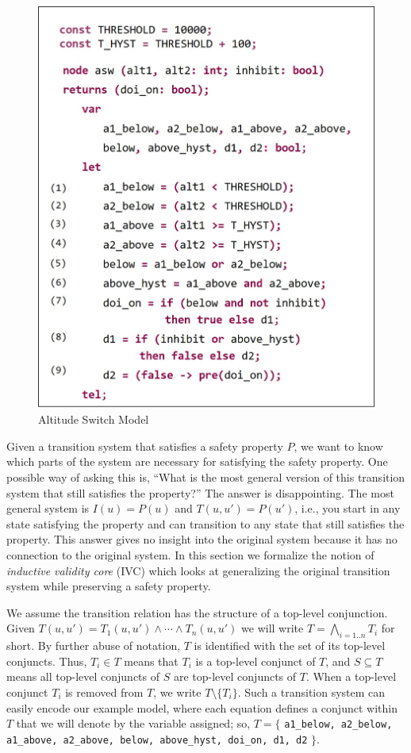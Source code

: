 \begin{figure}
\centering
\includegraphics[width=0.7\columnwidth]{figs/code.jpg}
\vspace{-0.1in}
\caption{Altitude Switch Model }
\label{fig:asw}
\end{figure}



Given a transition system that satisfies a safety property $P$, we
want to know which parts of the system are necessary for satisfying
the safety property. One possible way of asking this is, ``What is the
most general version of this transition system that still satisfies
the property?'' The answer is disappointing. The most general system is
$I(u) = P(u)$ and $T(u, u') = P(u')$, i.e., you start in any state
satisfying the property and can transition to any state that still
satisfies the property. This answer gives no insight into the original
system because it has no connection to the original system. In this
section we formalize the notion of {\em inductive validity core} (IVC)
which looks at generalizing the original transition system while
preserving a safety property.

We assume the transition relation has the structure of a top-level conjunction.  Given $T(u, u') = T_1(u, u') \land \cdots \land T_n(u, u')$ we will write $T = \bigwedge_{i=1..n}T_i$ for short.
By further abuse of notation,
$T$ is identified with the set of its top-level conjuncts. Thus, $T_i \in
T$ means that $T_i$ is a top-level conjunct of $T$, and $S
\subseteq T$ means all top-level conjuncts of $S$ are top-level
conjuncts of $T$. When a top-level conjunct $T_i$ is removed from $T$, we write $T \setminus \{T_i\}$. Such a transition system can easily encode our example model, where each equation defines a conjunct within $T$ that we will denote by the variable assigned; so, $T = \{$ {\small \texttt{a1\_below, a2\_below, a1\_above, a2\_above, below, above\_hyst, doi\_on, d1, d2}} $\}$.

